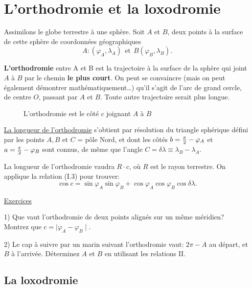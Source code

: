 \documentclass[12pt]{report}
\begin{document}
\bigskip

\chapter{L'orthodromie et la loxodromie}


Assimilons le globe terrestre à une sphère.
Soit $A$ et $B$, deux points à la surface de cette sphère de coordonnées géographiques
\[
A:(\varphi_A,\lambda_A) \  \ \mbox{et} \  \ B (\varphi_B, \lambda_B).
\]


\textbf{L'orthodromie} entre A et B est la trajectoire à la surface de la sphère qui joint $A$ à $B$ par le chemin \textbf{le plus court}. On peut se convaincre (mais on peut également démontrer mathématiquement\ldots) qu'il s'agit de l'arc de grand cercle, de centre $O$, passant par $A$ et $B$. Toute autre trajectoire serait plus longue.

\begin{figure}[ht]
\begin{center}
\end{center}
\caption{L'orthodromie est le côté $c$ joignant $A$ à $B$}
\label{fig:10}
\end{figure}



\underline{La longueur de l'orthodromie} s'obtient par résolution du triangle sphérique défini par les points $A,B$ et $C$ = pôle Nord, et dont les côtés $b={\pi\over 2}-\varphi_A$ et $a={\pi\over 2}-\varphi_B$ sont connus, de même que l'angle $C=\delta \lambda \equiv \lambda_B-\lambda_A$.

La longueur de l'orthodromie vaudra $R\cdot c$, où $R$ est le rayon terrestre. On applique la relation (I.3) pour trouver:
\[
\cos c = \sin \varphi_A \sin \varphi_B + \cos \varphi_A \cos \varphi_B \cos \delta \lambda.
\]


\bigskip\bigskip


\underline{Exercices}

1) Que vaut l'orthodromie de deux points alignés sur un même méridien? Montrez que $c=\mid \varphi_A - \varphi_B\mid$.

2) Le cap à suivre par un marin suivant l'orthodromie vaut: $2\pi-A$ au départ, et $B$ à l'arrivée. Déterminez $A$ et $B$ en utilisant les relations II.


 
\section{La loxodromie} 
\end{document}
